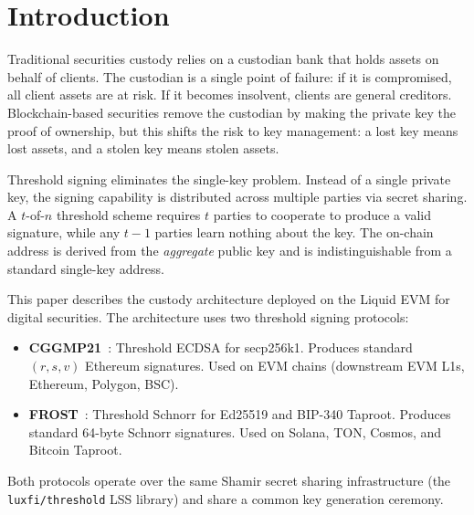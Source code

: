 \section{Introduction}

\label{sec:intro}

Traditional securities custody relies on a custodian bank that holds
assets on behalf of clients.  The custodian is a single point of
failure: if it is compromised, all client assets are at risk.  If it
becomes insolvent, clients are general creditors.  Blockchain-based
securities remove the custodian by making the private key the proof
of ownership, but this shifts the risk to key management: a lost key
means lost assets, and a stolen key means stolen assets.

Threshold signing eliminates the single-key problem.  Instead of a
single private key, the signing capability is distributed across
multiple parties via secret sharing.  A $t$-of-$n$ threshold scheme
requires $t$ parties to cooperate to produce a valid signature, while
any $t-1$ parties learn nothing about the key.  The on-chain address
is derived from the \emph{aggregate} public key and is
indistinguishable from a standard single-key address.

This paper describes the custody architecture deployed on the Liquid
EVM for digital securities.  The architecture uses two threshold
signing protocols:

\begin{itemize}[nosep]
  \item \textbf{CGGMP21}~\cite{cggmp21}: Threshold ECDSA for
        secp256k1.  Produces standard $(r, s, v)$ Ethereum signatures.
        Used on EVM chains (downstream EVM L1s, Ethereum, Polygon, BSC).
  \item \textbf{FROST}~\cite{frost}: Threshold Schnorr for Ed25519
        and BIP-340 Taproot.  Produces standard 64-byte Schnorr
        signatures.  Used on Solana, TON, Cosmos, and Bitcoin Taproot.
\end{itemize}

Both protocols operate over the same Shamir secret sharing
infrastructure (the \texttt{luxfi/threshold} LSS library) and share
a common key generation ceremony.

